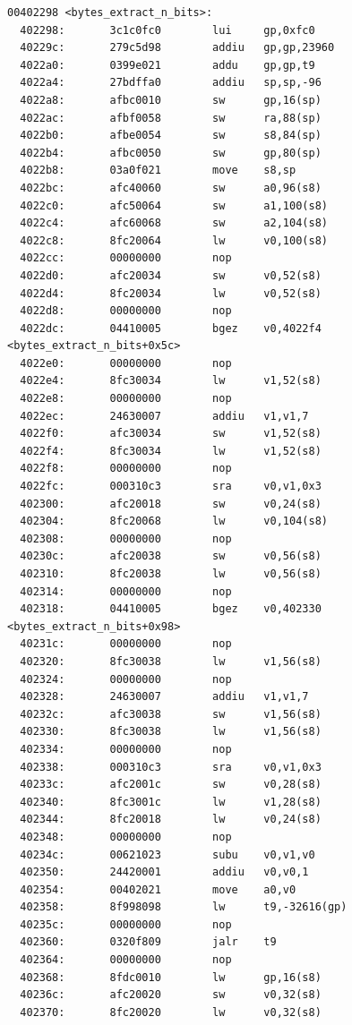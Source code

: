 \documentclass[11pt]{article}
\begin{document}
\begin{verbatim}
00402298 <bytes_extract_n_bits>:
  402298:       3c1c0fc0        lui     gp,0xfc0
  40229c:       279c5d98        addiu   gp,gp,23960
  4022a0:       0399e021        addu    gp,gp,t9
  4022a4:       27bdffa0        addiu   sp,sp,-96
  4022a8:       afbc0010        sw      gp,16(sp)
  4022ac:       afbf0058        sw      ra,88(sp)
  4022b0:       afbe0054        sw      s8,84(sp)
  4022b4:       afbc0050        sw      gp,80(sp)
  4022b8:       03a0f021        move    s8,sp
  4022bc:       afc40060        sw      a0,96(s8)
  4022c0:       afc50064        sw      a1,100(s8)
  4022c4:       afc60068        sw      a2,104(s8)
  4022c8:       8fc20064        lw      v0,100(s8)
  4022cc:       00000000        nop
  4022d0:       afc20034        sw      v0,52(s8)
  4022d4:       8fc20034        lw      v0,52(s8)
  4022d8:       00000000        nop
  4022dc:       04410005        bgez    v0,4022f4 <bytes_extract_n_bits+0x5c>
  4022e0:       00000000        nop
  4022e4:       8fc30034        lw      v1,52(s8)
  4022e8:       00000000        nop
  4022ec:       24630007        addiu   v1,v1,7
  4022f0:       afc30034        sw      v1,52(s8)
  4022f4:       8fc30034        lw      v1,52(s8)
  4022f8:       00000000        nop
  4022fc:       000310c3        sra     v0,v1,0x3
  402300:       afc20018        sw      v0,24(s8)
  402304:       8fc20068        lw      v0,104(s8)
  402308:       00000000        nop
  40230c:       afc20038        sw      v0,56(s8)
  402310:       8fc20038        lw      v0,56(s8)
  402314:       00000000        nop
  402318:       04410005        bgez    v0,402330 <bytes_extract_n_bits+0x98>
  40231c:       00000000        nop
  402320:       8fc30038        lw      v1,56(s8)
  402324:       00000000        nop
  402328:       24630007        addiu   v1,v1,7
  40232c:       afc30038        sw      v1,56(s8)
  402330:       8fc30038        lw      v1,56(s8)
  402334:       00000000        nop
  402338:       000310c3        sra     v0,v1,0x3
  40233c:       afc2001c        sw      v0,28(s8)
  402340:       8fc3001c        lw      v1,28(s8)
  402344:       8fc20018        lw      v0,24(s8)
  402348:       00000000        nop
  40234c:       00621023        subu    v0,v1,v0
  402350:       24420001        addiu   v0,v0,1
  402354:       00402021        move    a0,v0
  402358:       8f998098        lw      t9,-32616(gp)
  40235c:       00000000        nop
  402360:       0320f809        jalr    t9
  402364:       00000000        nop
  402368:       8fdc0010        lw      gp,16(s8)
  40236c:       afc20020        sw      v0,32(s8)
  402370:       8fc20020        lw      v0,32(s8)

\end{verbatim}
\end{document}
